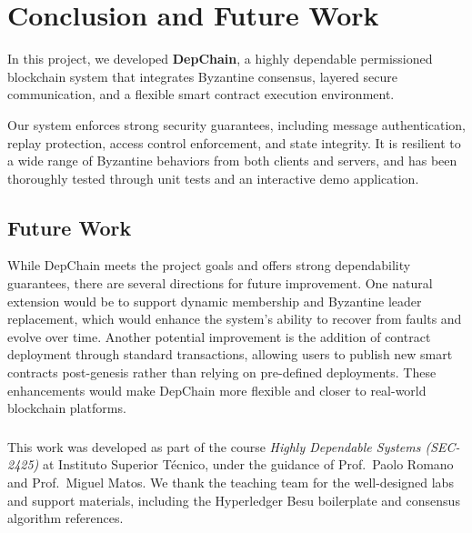 \documentclass[runningheads]{llncs}
\begin{document}
\section{Conclusion and Future Work}

In this project, we developed \textbf{DepChain}, a highly dependable permissioned blockchain system that integrates Byzantine consensus, layered secure communication, and a flexible smart contract execution environment.

Our system enforces strong security guarantees, including message authentication, replay protection, access control enforcement, and state integrity. It is resilient to a wide range of Byzantine behaviors from both clients and servers, and has been thoroughly tested through unit tests and an interactive demo application.

\subsection{Future Work}

While DepChain meets the project goals and offers strong dependability guarantees, there are several directions for future improvement. One natural extension would be to support dynamic membership and Byzantine leader replacement, which would enhance the system's ability to recover from faults and evolve over time. Another potential improvement is the addition of contract deployment through standard transactions, allowing users to publish new smart contracts post-genesis rather than relying on pre-defined deployments. These enhancements would make DepChain more flexible and closer to real-world blockchain platforms.

\begin{credits}
\subsubsection{\ackname} 
This work was developed as part of the course \textit{Highly Dependable Systems (SEC-2425)} at Instituto Superior Técnico, under the guidance of Prof.\ Paolo Romano and Prof.\ Miguel Matos. We thank the teaching team for the well-designed labs and support materials, including the Hyperledger Besu boilerplate and consensus algorithm references.
\end{credits}
\end{document}
